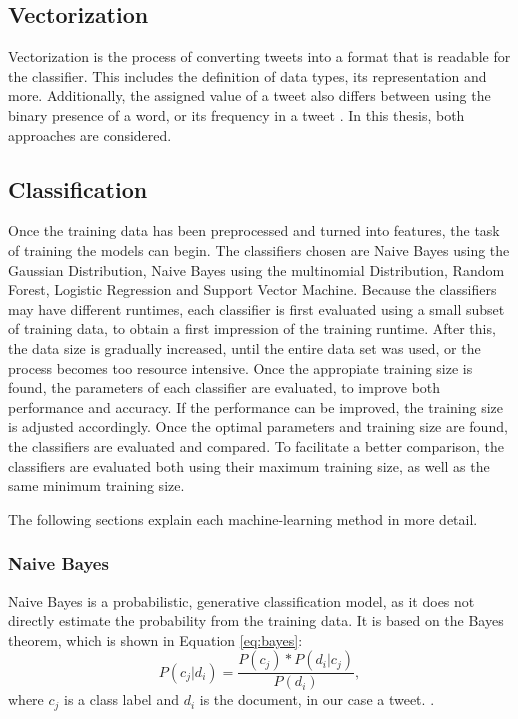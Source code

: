 \subsection{Vectorization}
Vectorization is the process of converting tweets into a format that is readable for the classifier. This includes the definition of data types, its representation and more. Additionally, the assigned value of a tweet also differs between using the binary presence of a word, or its frequency in a tweet \cite{DBLP:journals/csur/GiachanouC16}. In this thesis, both approaches are considered.

\subsection{Classification}
Once the training data has been preprocessed and turned into features, the task of training the models can begin. The classifiers chosen are Naive Bayes using the Gaussian Distribution, Naive Bayes using the multinomial Distribution, Random Forest, Logistic Regression and Support Vector Machine. Because the classifiers may have different runtimes, each classifier is first evaluated using a small subset of training data, to obtain a first impression of the training runtime. After this, the data size is gradually increased, until the entire data set was used, or the process becomes too resource intensive. Once the appropiate training size is found, the parameters of each classifier are evaluated, to improve both performance and accuracy. If the performance can be improved, the training size is adjusted accordingly. Once the optimal parameters and training size are found, the classifiers are evaluated and compared. To facilitate a better comparison, the classifiers are evaluated both using their maximum training size, as well as the same minimum training size.

The following sections explain each machine-learning method in more detail.

    \subsubsection{Naive Bayes}
        Naive Bayes is a probabilistic, generative classification model, as it does not directly estimate the probability from the training data. It is based on the Bayes theorem, which is shown in Equation \eqref{eq:bayes}:
        \begin{equation}
            \label{eq:bayes}
            P(c_j|d_i) = \frac{P(c_j) * P(d_i|c_j)}{P(d_i)},
        \end{equation}
        where $c_j$ is a class label and $d_i$ is the document, in our case a tweet. \cite{DBLP:books/aw/TanSKK2019}. 
        
